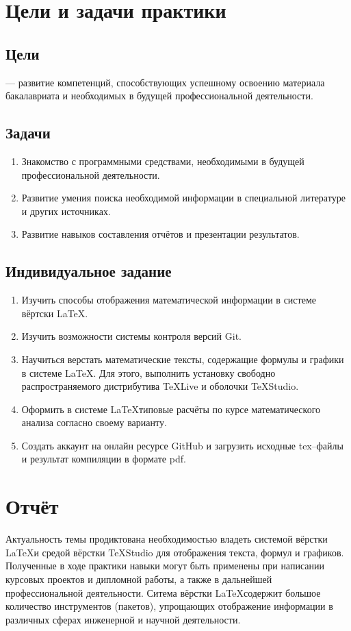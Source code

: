 \documentclass[12pt]{article}
\begin{document}
\section{Цели и задачи практики}	
\subsection{Цели}
--- развитие компетенций, способствующих успешному освоению материала бакалавриата и необходимых в будущей профессиональной деятельности.
\subsection{Задачи}
\begin{enumerate}
\item Знакомство с программными средствами, необходимыми в будущей профессиональной деятельности.
\item Развитие умения поиска необходимой информации в специальной литературе и других источниках.
\item Развитие навыков составления отчётов и презентации результатов.
\end{enumerate}
\subsection{Индивидуальное задание}	
\begin{enumerate}
\item Изучить способы отображения математической информации в системе вёртски \LaTeX.
\item Изучить возможности  системы контроля версий \textsf{Git}.
\item Научиться верстать математические тексты, содержащие формулы и графики в системе \LaTeX.
Для этого, выполнить установку свободно распространяемого дистрибутива \textsf{TeXLive} и оболочки \textsf{TeXStudio}.
\item Оформить в системе \LaTeX типовые расчёты по курсе математического анализа согласно своему варианту.
\item Создать аккаунт на онлайн ресурсе \textsf{GitHub} и загрузить исходные \textsf{tex}--файлы 
и результат компиляции в формате \textsf{pdf}.
\end{enumerate} 
\newpage
\section{Отчёт}
Актуальность темы продиктована необходимостью владеть системой вёрстки \LaTeX и средой вёрстки \textsf{TeXStudio} для
отображения текста, формул и графиков. Полученные в ходе практики навыки могут быть применены при написании
курсовых проектов и дипломной работы, а также в дальнейшей профессиональной деятельности.
Ситема вёрстки \LaTeX содержит большое количество инструментов (пакетов), упрощающих отображение информации в различных 
сферах инженерной и научной деятельности. 
\newpage
\end{document}

